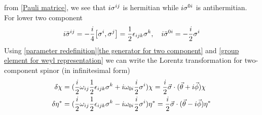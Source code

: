 from \eqref{Pauli matrice}, we see that $i\sigma^{ij}$ is hermitian while $i\sigma^{0i}$ is antihermitian. For lower two component
\begin{equation}
  i\bar{\s}^{ij} = -\frac{i}{4}\comm{\s^{i}}{\s^{j}} = \half\e_{ijk} \s^k ,\quad
i\bar{\s}^{0i} = -\frac{i}{2}\s^{i}
\end{equation}
Using  \eqref{parameter redefinition}\eqref{the generator for  two component} and \eqref{group element for weyl representation}
we can write the Lorentz transformation for two-component spinor (in infinitesimal form)
\begin{align}\label{infinitesimal transformation for two component spinor}
\delta\chi &= (\frac{i}{2} \omega_{ij}\frac{1}{2}\epsilon_{ijk}\sigma^k
       +i \omega_{0i}\frac{i}{2}\sigma^{i})\chi
     = \frac{i}{2}\vec{\sigma}\cdot(\vec{\theta}+i\vec{\phi})\chi\notag\\
\delta\eta^* &= (\frac{i}{2} \omega_{ij}\frac{1}{2}\epsilon_{ijk}\sigma^k
-i \omega_{0i}\frac{i}{2}\sigma^{i})\eta^*
= \frac{i}{2}\vec{\sigma}\cdot(\vec{\theta}-i\vec{\phi})\eta^*
\end{align}

